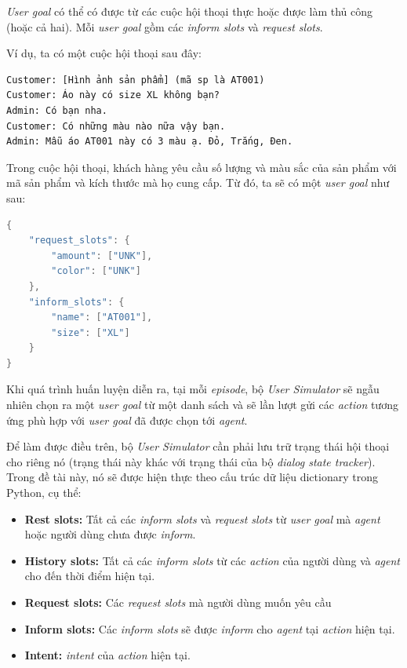 \textit{User goal} có thể có được từ các cuộc hội thoại thực hoặc
được làm thủ công (hoặc cả hai). Mỗi \textit{user goal} gồm các
\textit{inform slots} và \textit{request slots}.

Ví dụ, ta có một cuộc hội thoại sau đây:

\begin{verbatim}
Customer: [Hình ảnh sản phẩm] (mã sp là AT001)
Customer: Áo này có size XL không bạn?
Admin: Có bạn nha.
Customer: Có những màu nào nữa vậy bạn.
Admin: Mẫu áo AT001 này có 3 màu ạ. Đỏ, Trắng, Đen.
\end{verbatim}

Trong cuộc hội thoại, khách hàng yêu cầu số lượng và màu sắc của sản phẩm với mã sản phẩm và kích thước mà họ cung cấp. Từ đó, ta sẽ có một \textit{user goal} như sau:

\begin{lstlisting}[language=Java]
{
    "request_slots": {
    	"amount": ["UNK"],
    	"color": ["UNK"]
    },
    "inform_slots": {
    	"name": ["AT001"],
    	"size": ["XL"]
    }
}
\end{lstlisting}

Khi quá trình huấn luyện diễn ra, tại mỗi \textit{episode}, bộ
\textit{User Simulator} sẽ ngẫu nhiên chọn ra một \textit{user goal}
từ một danh sách và sẽ lần lượt gửi các \textit{action} tương ứng
phù hợp với \textit{user goal} đã được chọn tới \textit{agent}.

Để làm được điều trên, bộ \textit{User Simulator} cần phải lưu trữ
trạng thái hội thoại cho riêng nó (trạng thái này khác với trạng thái
của bộ \textit{dialog state tracker}). Trong đề tài này, nó sẽ được
hiện thực theo cấu trúc dữ liệu dictionary trong Python, cụ thể:

\begin{itemize}
    \item \textbf{Rest slots:} Tất cả các \textit{inform slots} và
    \textit{request slots} từ \textit{user goal} mà \textit{agent}
    hoặc người dùng chưa được \textit{inform}.
    \item \textbf{History slots:} Tất cả các \textit{inform slots}
    từ các \textit{action} của người dùng và \textit{agent}
    cho đến thời điểm hiện tại.
    \item \textbf{Request slots:} Các \textit{request slots} mà
    người dùng muốn yêu cầu
    \item \textbf{Inform slots:} Các \textit{inform slots} sẽ được
    \textit{inform} cho \textit{agent} tại \textit{action} hiện tại.
    \item \textbf{Intent:} \textit{intent} của \textit{action} hiện tại.
\end{itemize}

